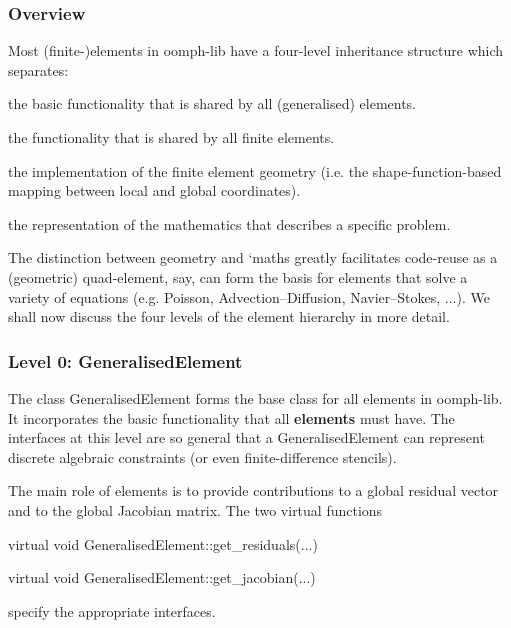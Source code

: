 \hypertarget{index_Overview}{}\subsubsection{Overview}\label{index_Overview}
Most (finite-\/)elements in {\ttfamily oomph-\/lib} have a four-\/level inheritance structure which separates\+:
\begin{DoxyEnumerate}
\item the basic functionality that is shared by all (generalised) elements.
\item the functionality that is shared by all finite elements.
\item the implementation of the finite element geometry (i.\+e. the shape-\/function-\/based mapping between local and global coordinates).
\item the representation of the mathematics that describes a specific problem.
\end{DoxyEnumerate}The distinction between geometry and `maths\textquotesingle{} greatly facilitates code-\/reuse as a (geometric) quad-\/element, say, can form the basis for elements that solve a variety of equations (e.\+g. Poisson, Advection--Diffusion, Navier--Stokes, ...). We shall now discuss the four levels of the element hierarchy in more detail.\hypertarget{index_Generalised_Element}{}\subsubsection{Level 0\+: Generalised\+Element}\label{index_Generalised_Element}
The class {\ttfamily Generalised\+Element} forms the base class for all elements in {\ttfamily oomph-\/lib}. It incorporates the basic functionality that all {\bfseries elements} must have. The interfaces at this level are so general that a {\ttfamily Generalised\+Element} can represent discrete algebraic constraints (or even finite-\/difference stencils).

The main role of elements is to provide contributions to a global residual vector and to the global Jacobian matrix. The two virtual functions 
\begin{DoxyCode}
\textcolor{keyword}{virtual} \textcolor{keywordtype}{void} GeneralisedElement::get\_residuals(...) 
\end{DoxyCode}
 
\begin{DoxyCode}
\textcolor{keyword}{virtual} \textcolor{keywordtype}{void} GeneralisedElement::get\_jacobian(...) 
\end{DoxyCode}
 specify the appropriate interfaces.

